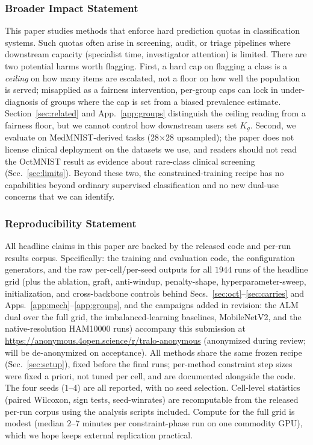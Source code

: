 \documentclass[10pt]{article}
\begin{document}
\subsubsection*{Broader Impact Statement}
This paper studies methods that enforce hard prediction quotas in
classification systems. Such quotas often arise in screening, audit, or
triage pipelines where downstream capacity (specialist time, investigator
attention) is limited. There are two potential harms worth flagging.
First, a hard cap on flagging a class is a \emph{ceiling} on how many
items are escalated, not a floor on how well the population is served;
misapplied as a fairness intervention, per-group caps can lock in
under-diagnosis of groups where the cap is set from a biased prevalence
estimate. Section~\ref{sec:related} and App.~\ref{app:groups} distinguish
the ceiling reading from a fairness floor, but we cannot control how
downstream users set $K_g$. Second, we evaluate on MedMNIST-derived
tasks (28$\times$28 upsampled); the paper does not license clinical
deployment on the datasets we use, and readers should not read the
OctMNIST result as evidence about rare-class clinical screening
(Sec.~\ref{sec:limits}). Beyond these two, the constrained-training
recipe has no capabilities beyond ordinary supervised classification and
no new dual-use concerns that we can identify.

\subsubsection*{Reproducibility Statement}
All headline claims in this paper are backed by the released code and
per-run results corpus. Specifically: the training and evaluation code,
the configuration generators, and the raw per-cell/per-seed outputs for
all $1944$ runs of the headline grid (plus the ablation, graft,
anti-windup, penalty-shape, hyperparameter-sweep, initialization, and
cross-backbone controls behind
Secs.~\ref{sec:oct}--\ref{sec:carries} and Apps.~\ref{app:mech}--\ref{app:groups}{,
and the campaigns added in revision: the ALM dual over the full grid, the
imbalanced-learning baselines, MobileNetV2, and the native-resolution
HAM10000 runs})
accompany this submission at
\url{https://anonymous.4open.science/r/tralo-anonymous}
(anonymized during review; will be de-anonymized on acceptance). All
methods share the same frozen recipe (Sec.~\ref{sec:setup}), fixed before
the final runs; per-method constraint step sizes were fixed a priori, not
tuned per cell, and are documented alongside the code. The four seeds
($1$--$4$) are all reported, with no seed selection. Cell-level statistics (paired Wilcoxon, sign tests,
seed-winrates) are recomputable from the released per-run corpus using
the analysis scripts included. Compute for the full grid is modest
(median $2$--$7$ minutes per constraint-phase run on one commodity GPU),
which we hope keeps external replication practical.
\end{document}
